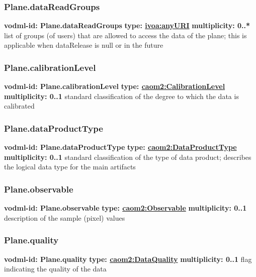     \subsubsection{Plane.dataReadGroups}
      \textbf{vodml-id: Plane.dataReadGroups} \newline
      \textbf{type: \hyperref[sect:ivoa]{ivoa:anyURI}} \newline
      \textbf{multiplicity: 0..*} \newline
      list of groups (of users) that are allowed to access the data of the plane; this is applicable when dataRelease is null or in the future

    \subsubsection{Plane.calibrationLevel}
      \textbf{vodml-id: Plane.calibrationLevel} \newline
      \textbf{type: \hyperref[sect:CalibrationLevel]{caom2:CalibrationLevel}} \newline
      \textbf{multiplicity: 0..1} \newline
      standard classification of the degree to which the data is calibrated

    \subsubsection{Plane.dataProductType}
      \textbf{vodml-id: Plane.dataProductType} \newline
      \textbf{type: \hyperref[sect:DataProductType]{caom2:DataProductType}} \newline
      \textbf{multiplicity: 0..1} \newline
      standard classification of the type of data product; describes the logical data type for the main artifacts

    \subsubsection{Plane.observable}
      \textbf{vodml-id: Plane.observable} \newline
      \textbf{type: \hyperref[sect:Observable]{caom2:Observable}} \newline
      \textbf{multiplicity: 0..1} \newline
      description of the sample (pixel) values

    \subsubsection{Plane.quality}
      \textbf{vodml-id: Plane.quality} \newline
      \textbf{type: \hyperref[sect:DataQuality]{caom2:DataQuality}} \newline
      \textbf{multiplicity: 0..1} \newline
      flag indicating the quality of the data

